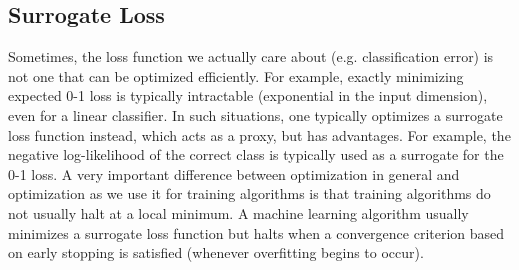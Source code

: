\subsection{Surrogate Loss}
Sometimes, the loss function we actually care about (e.g. classification error) is not one that can be optimized efficiently. For example, exactly minimizing expected 0-1 loss is typically intractable (exponential in the input dimension), even for a linear classifier. In such situations, one typically optimizes a surrogate loss function instead, which acts as a proxy, but has advantages. For example, the negative log-likelihood of the correct class is typically used as a surrogate for the 0-1 loss.\newline\newline
A very important difference between optimization in general and optimization
as we use it for training algorithms is that training algorithms do not usually halt at a local minimum. A machine learning algorithm usually minimizes a surrogate loss function but halts when a convergence criterion based on early stopping is satisfied (whenever overfitting begins to occur).


